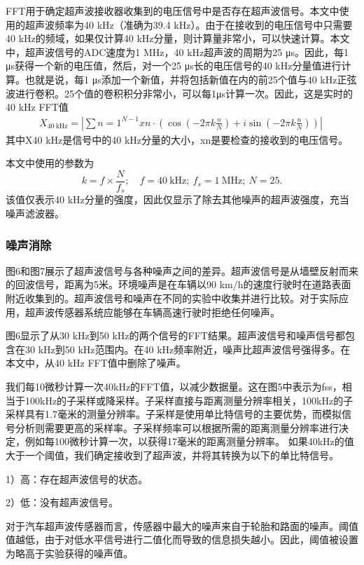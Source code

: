 FFT用于确定超声波接收器收集到的电压信号中是否存在超声波信号。本文中使用的超声波频率为40 kHz（准确为39.4 kHz）。由于在接收到的电压信号中只需要40 kHz的频域，如果仅计算40 kHz分量，则计算量非常小，可以快速计算。本文中，超声波信号的ADC速度为1 MHz，40 kHz超声波的周期为25 μs。因此，每1 μs获得一个新的电压值，然后，对一个25 μs长的电压信号的40 kHz分量值进行计算。也就是说，每1 μs添加一个新值，并将包括新值在内的前25个值与40 kHz正弦波进行卷积。25个值的卷积积分非常小，可以每1μs计算一次。因此，这是实时的40 kHz FFT值
\begin{align*}
	X_{40~\text {kHz}} = \left |{\sum {n=1}^{N-1} x{n} \cdot \left ({\cos \left ({-2 \pi k \frac {n}{N}}\right) + i \sin \left ({-2 \pi k \frac {n}{N}}\right)}\right)}\right | \
	{}\tag{9}
\end{align*}
其中X40 kHz是信号中的40 kHz分量的大小，xn是要检查的接收到的电压信号。

本文中使用的参数为
\begin{equation*}
	k = f \times \frac {N}{f_{s}};\quad f = 40~\text {kHz};
	~ f_{s} = 1~\text {MHz};~ N = 25.
\end{equation*}
该值仅表示40 kHz分量的强度，因此仅显示了除去其他噪声的超声波强度，充当噪声滤波器。
\subsubsection{噪声消除}
图6和图7展示了超声波信号与各种噪声之间的差异。超声波信号是从墙壁反射而来的回波信号，距离为5米。环境噪声是在车辆以90 km/h的速度行驶时在道路表面附近收集到的。超声波信号和噪声在不同的实验中收集并进行比较。对于实际应用，超声波传感器系统应能够在车辆高速行驶时拒绝任何噪声。

图6显示了从30 kHz到50 kHz的两个信号的FFT结果。超声波信号和噪声信号都包含在30 kHz到50 kHz范围内。在40 kHz频率附近，噪声比超声波信号强得多。在本文中，从40 kHz FFT值中删除了噪声。

我们每10微秒计算一次40kHz的FFT值，以减少数据量。这在图5中表示为fss，相当于100kHz的子采样或降采样。子采样直接与距离测量分辨率相关，100kHz的子采样具有1.7毫米的测量分辨率。子采样是使用单比特信号的主要优势，而模拟信号分析则需要更高的采样率。子采样频率可以根据所需的距离测量分辨率进行决定，例如每100微秒计算一次，以获得17毫米的距离测量分辨率。
如果40kHz的值大于一个阈值，我们确定接收到了超声波，并将其转换为以下的单比特信号。

1）高：存在超声波信号的状态。

2）低：没有超声波信号。

对于汽车超声波传感器而言，传感器中最大的噪声来自于轮胎和路面的噪声。阈值值越低，由于对低水平信号进行二值化而导致的信息损失越小。因此，阈值被设置为略高于实验获得的噪声值。

